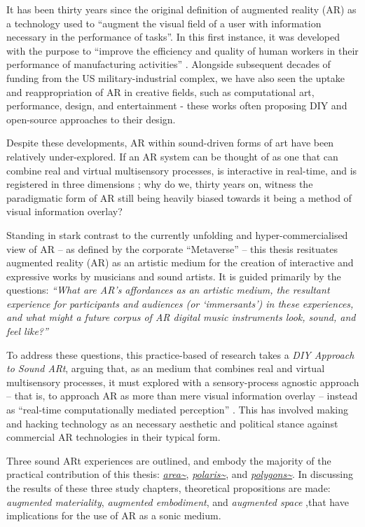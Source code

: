 \begin{SingleSpace}
    It has been thirty years since the original definition of augmented reality (AR) as a technology used to ``augment the visual field of a user with information necessary in the performance of tasks''. In this first instance, it was developed with the purpose to ``improve the efficiency and quality of human workers in their performance of manufacturing activities'' \citep{caudell1992}. Alongside subsequent decades of funding from the US military-industrial complex, we have also seen the uptake and reappropriation of AR in creative fields, such as computational art, performance, design, and entertainment - these works often proposing DIY and open-source approaches to their design. 

    Despite these developments, AR within sound-driven forms of art have been relatively under-explored. If an AR system can be thought of as one that can combine real and virtual multisensory processes, is interactive in real-time, and is registered in three dimensions \citep{azuma1997}; why do we, thirty years on, witness the paradigmatic form of AR still being heavily biased \citep{billinghurst2015} towards it being a method of visual information overlay?
    
    Standing in stark contrast to the currently unfolding and hyper-commercialised view of AR --  as defined by the corporate ``Metaverse'' --  this thesis resituates augmented reality (AR) as an artistic medium for the creation of interactive and expressive works by musicians and sound artists. It is guided primarily by the questions: \textit{``What are AR's affordances as an artistic medium, the resultant experience for participants and audiences (or `immersants') in these experiences, and what might a future corpus of AR digital music instruments look, sound, and feel like?''}
    
    To address these questions, this practice-based of research takes a \textit{DIY Approach to Sound ARt}, arguing that, as an medium that combines real and virtual multisensory processes, it must explored with a sensory-process agnostic approach -- that is, to approach AR as more than mere visual information overlay -- instead as ``real-time computationally mediated perception'' \citep{chevalier2020}. This has involved making and hacking technology as an necessary aesthetic and political stance against commercial AR technologies in their typical form.
    
    Three sound ARt experiences are outlined, and embody the majority of the practical contribution of this thesis: \textit{\href{https://github.com/sambilbow/area}{area\textasciitilde{}}}, \textit{\href{https://github.com/sambilbow/polaris}{polaris\textasciitilde{}}}, and \textit{\href{https://github.com/sambilbow/polygons}{polygons\textasciitilde{}}}. In discussing the results of these three study chapters, theoretical propositions are made: \textit{augmented materiality}, \textit{augmented embodiment}, and \textit{augmented space} ,that have implications for the use of AR as a sonic medium.
    

\end{SingleSpace}
